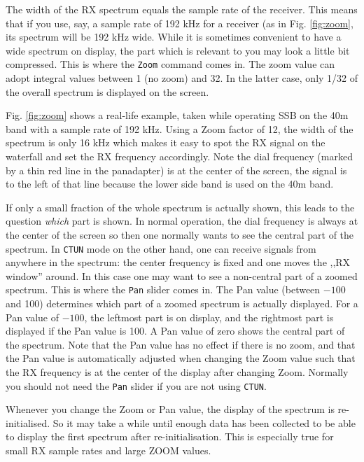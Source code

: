 \documentclass[12pt]{book}
\def\bltt#1{\texttt{\color{blue}#1}}
\begin{document}
The width of the RX spectrum equals the sample rate
of the receiver. This means that if you use, say,
a sample rate of 192 kHz for a receiver (as in Fig. \ref{fig:zoom},
 its spectrum
will be 192 kHz wide. While it is sometimes convenient to
have a wide spectrum on display, the part which is relevant to
you may look a little bit
compressed. This is where the \bltt{Zoom} command
comes in. The zoom value can adopt integral values between
1 (no zoom) and 32. In the latter case, only 1/32 of the
overall spectrum is displayed on the screen.

Fig. \ref{fig:zoom} shows a real-life example, taken while
operating SSB on the 40m band with a sample rate of 192 kHz.
Using a Zoom factor of 12, the width of the spectrum is only
16 kHz which makes it easy to spot the RX signal on the
waterfall and set the RX frequency accordingly. Note the
dial frequency (marked by a thin red line in the panadapter)
is at the center of the screen, the signal is to the left
of that line because the lower side band is used on the
40m band.

If only a small fraction of the whole spectrum is actually shown, this
leads to the question \textit{which} part is shown. In normal operation,
the dial frequency is always at the center of the screen so then one
normally wants to see the central part of the spectrum. In \bltt{CTUN}
mode on the other hand, one can receive signals from anywhere in the spectrum:
the center frequency is fixed and one moves the ,,RX window'' around. In
this case one may want to see a non-central part of a zoomed spectrum.
This is where the \bltt{Pan} slider comes in. The Pan value
(between $-100$ and 100) determines which part of a zoomed spectrum
is actually displayed. For a Pan value of $-100$, the leftmost part is
on display, and the rightmost part is displayed if the Pan value is 100.
A Pan value of zero shows the central part of the spectrum. Note that the
Pan value has no effect if there is no zoom, and that the Pan value is
automatically adjusted when changing the Zoom value such that the RX
frequency is at the center of the display after changing Zoom.
Normally you should not need the \bltt{Pan} slider if you are not using
\bltt{CTUN}.

Whenever you change the Zoom or Pan value, the display of the
spectrum is re-initialised. So it may take a while until enough
data has been collected to be able to display the first
spectrum after re-initialisation. This is especially true
for small RX sample rates and large ZOOM values.
\end{document}
